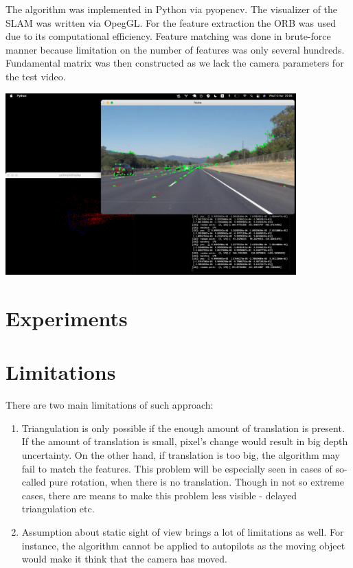 The algorithm was implemented in Python via pyopencv. The visualizer of the SLAM was written via OpegGL. For the feature extraction the ORB was used due to its computational efficiency. Feature matching was done in brute-force manner because limitation on the number of features was only several hundreds. Fundamental matrix was then constructed as we lack the camera parameters for the test video. 

\begin{center}
    \includegraphics[height=7cm]{res.png}\\[1cm]
\end{center}

\section{Experiments}

\section{Limitations}

There are two main limitations of such approach:
\begin{enumerate}
    \item Triangulation is only possible if the enough amount of translation is present. If the amount of translation is small, pixel's change would result in big depth uncertainty. On the other hand, if translation is too big, the algorithm may fail to match the features. This problem will be especially seen in cases of so-called pure rotation, when there is no translation. Though in not so extreme cases, there are means to make this problem less visible - delayed triangulation etc.
    \item Assumption about static sight of view brings a lot of limitations as well.  For instance, the algorithm cannot be applied to autopilots as the moving object would make it think that the camera has moved. 
\end{enumerate}

